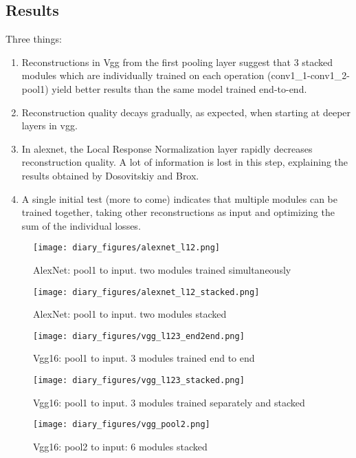 \documentclass{article}
\begin{document}
\subsection*{Results}
Three things:
\begin{enumerate}
    \item Reconstructions in Vgg from the first pooling layer suggest that 3 stacked modules which are individually trained on each operation (conv1\_1-conv1\_2-pool1) yield better results than the same model trained end-to-end.
    \item Reconstruction quality decays gradually, as expected, when starting at deeper layers in vgg.
    \item In alexnet, the Local Response Normalization layer rapidly decreases reconstruction quality. A lot of information is lost in this step, explaining the results obtained by Dosovitskiy and Brox.
    \item A single initial test (more to come) indicates that multiple modules can be trained together, taking other reconstructions as input and optimizing the sum of the individual losses.
\end{enumerate}

\FloatBarrier

\begin{figure}
    \centering
    \texttt{[image: diary\_figures/alexnet\_l12.png]}
    \caption{AlexNet: pool1 to input. two modules trained simultaneously}
    \label{fig:may10_a_l12}
\end{figure}


\begin{figure}
    \centering
    \texttt{[image: diary\_figures/alexnet\_l12\_stacked.png]}
    \caption{AlexNet: pool1 to input. two modules stacked}
    \label{fig:may10_a_l12s}
\end{figure}

\begin{figure}
    \centering
    \texttt{[image: diary\_figures/vgg\_l123\_end2end.png]}
    \caption{Vgg16: pool1 to input. 3 modules trained end to end}
    \label{fig:may10_v_l123e2e}
\end{figure}

\begin{figure}
    \centering
    \texttt{[image: diary\_figures/vgg\_l123\_stacked.png]}
    \caption{Vgg16: pool1 to input. 3 modules trained separately and stacked}
    \label{fig:may10_v_l123s}
\end{figure}

\begin{figure}
    \centering
    \texttt{[image: diary\_figures/vgg\_pool2.png]}
    \caption{Vgg16: pool2 to input: 6 modules stacked}
    \label{fig:may10_v_pool2}
\end{figure}
\end{document}
